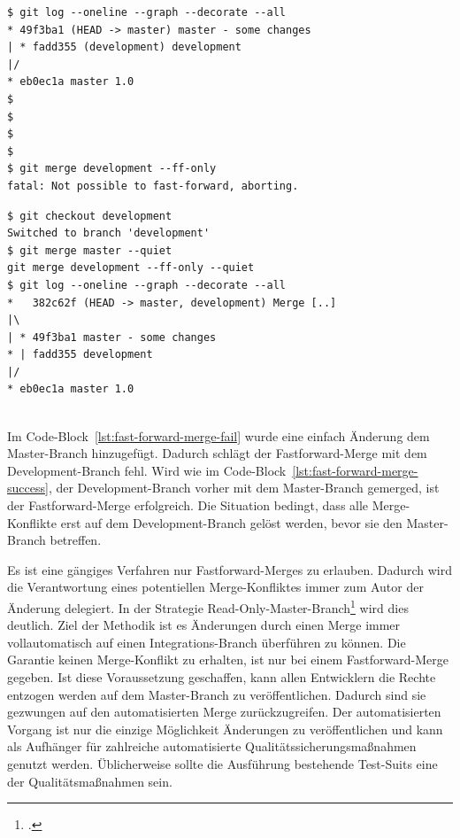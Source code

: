 \begin{minipage}{.45\textwidth}
\begin{lstlisting}[caption={Der development Branch schlägt fehl beim Fastforward-Merge}, frame=none,label={lst:fast-forward-merge-fail}]
$ git log --oneline --graph --decorate --all
* 49f3ba1 (HEAD -> master) master - some changes
| * fadd355 (development) development
|/
* eb0ec1a master 1.0
$
$
$
$
$ git merge development --ff-only
fatal: Not possible to fast-forward, aborting.
\end{lstlisting}
\end{minipage}\hfill
\begin{minipage}{.45\textwidth}
\begin{lstlisting}[caption={Nach einem Merge ist der Fastforward-Merge möglich},frame=none,label={lst:fast-forward-merge-success}]
$ git checkout development
Switched to branch 'development'
$ git merge master --quiet
git merge development --ff-only --quiet
$ git log --oneline --graph --decorate --all
*   382c62f (HEAD -> master, development) Merge [..]
|\
| * 49f3ba1 master - some changes
* | fadd355 development
|/
* eb0ec1a master 1.0
\end{lstlisting}
\end{minipage}
\\
Im Code-Block~\ref{lst:fast-forward-merge-fail} wurde eine einfach Änderung dem Master-Branch hinzugefügt. Dadurch schlägt der Fastforward-Merge mit dem Development-Branch fehl. Wird wie im Code-Block~\ref{lst:fast-forward-merge-success}, der Development-Branch vorher mit dem Master-Branch gemerged, ist der Fastforward-Merge erfolgreich. Die Situation bedingt, dass alle Merge-Konflikte erst auf dem Development-Branch gelöst werden, bevor sie den Master-Branch betreffen.

Es ist eine gängiges Verfahren nur Fastforward-Merges zu erlauben. Dadurch wird die Verantwortung eines potentiellen Merge-Konfliktes immer zum Autor der Änderung delegiert.
In der Strategie \glqq Read-Only-Master-Branch\grqq{}\footcite{master-read-only} wird dies deutlich. Ziel der Methodik ist es Änderungen durch einen Merge immer vollautomatisch auf einen Integrations-Branch überführen zu können. Die Garantie keinen Merge-Konflikt zu erhalten, ist nur bei einem Fastforward-Merge gegeben. Ist diese Voraussetzung geschaffen, kann allen Entwicklern die Rechte entzogen werden auf dem Master-Branch zu veröffentlichen. Dadurch sind sie gezwungen auf den automatisierten Merge zurückzugreifen. Der automatisierten Vorgang ist nur die einzige Möglichkeit Änderungen zu veröffentlichen und kann als Aufhänger für zahlreiche automatisierte Qualitätssicherungsmaßnahmen genutzt werden. Üblicherweise sollte die Ausführung bestehende Test-Suits eine der Qualitätsmaßnahmen sein.

